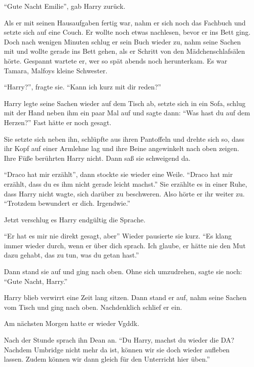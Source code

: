 \enquote{Gute Nacht Emilie}, gab Harry zurück.

Als er mit seinen Hausaufgaben fertig war, nahm er sich noch das Fachbuch und setzte sich auf eine Couch. Er wollte noch etwas nachlesen, bevor er ins Bett ging. Doch nach wenigen Minuten schlug er sein Buch wieder zu, nahm seine Sachen mit und wollte gerade ins Bett gehen, als er Schritt von den Mädchenschlafsälen hörte. Gespannt wartete er, wer so spät abends noch herunterkam. Es war Tamara, Malfoys kleine Schwester.

\enquote{Harry?}, fragte sie. \enquote{Kann ich kurz mit dir reden?}

Harry legte seine Sachen wieder auf dem Tisch ab, setzte sich in ein Sofa, schlug mit der Hand neben ihm ein paar Mal auf und sagte dann: \enquote{Was hast du auf dem Herzen?} Fast hätte er noch  gesagt.

Sie setzte sich neben ihn, schlüpfte aus ihren Pantoffeln und drehte sich so, dass ihr Kopf auf einer Armlehne lag und ihre Beine angewinkelt nach oben zeigen. Ihre Füße berührten Harry nicht. Dann saß sie schweigend da.

\enquote{Draco hat mir erzählt\abs}, dann stockte sie wieder eine Weile. \enquote{Draco hat mir erzählt, dass du es ihm nicht gerade leicht machst.} Sie erzählte es in einer Ruhe, dass Harry nicht wagte, sich darüber zu beschweren. Also hörte er ihr weiter zu. \enquote{Trotzdem bewundert er dich. Irgendwie.}

Jetzt verschlug es Harry endgültig die Sprache. 

\enquote{Er hat es mir nie direkt gesagt, aber\abs} Wieder pausierte sie kurz. \enquote{Es klang immer wieder durch, wenn er über dich sprach. Ich glaube, er hätte nie den Mut dazu gehabt, das zu tun, was du getan hast.}

Dann stand sie auf und ging nach oben. Ohne sich umzudrehen, sagte sie noch: \enquote{Gute Nacht, Harry.}

Harry blieb verwirrt eine Zeit lang sitzen.  Dann stand er auf, nahm seine Sachen vom Tisch und ging nach oben. Nachdenklich schlief er ein.

Am nächsten Morgen hatte er wieder Vgddk.

Nach der Stunde sprach ihn Dean an. \enquote{Du Harry, machst du wieder die DA? Nachdem Umbridge nicht mehr da ist, können wir sie doch wieder aufleben lassen. Zudem können wir dann gleich für den Unterricht hier üben.}

